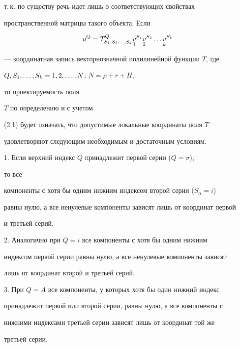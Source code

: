 т.\,к. по существу речь идет лишь о соответствующих свойствах


пространственной матрицы такого объекта. Если


\begin{equation}


u^Q=T^Q_{S_1,S_2,\dotsc,S_k}


\down{1}{v}^{S_1}\down{2}{v}^{S_2}\dotsc\down{k}{v}^{S_k}


\end{equation}


--- координатная запись векторнозначной полилинейной функции $T$, где


$Q,S_1,\dotsc,S_k=\linebreak 1,2,\dotsc,N$; $N=\rho+r+H$,


то проектируемость поля


$T$ по определению и с учетом


(2.1) будет означать, что допустимые локальные координаты поля $T$


удовлетворяют следующим необходимым и достаточным условиям.





1. Если верхний индекс $Q$ принадлежит первой серии ($Q=\sigma$),


то все


компоненты с хотя бы одним нижним индексом второй серии ($S_\alpha=i$)


равны нулю, а все ненулевые компоненты зависят лишь от координат первой


и третьей серий.





2. Аналогично при $Q=i$ все компоненты с хотя бы одним нижним


индексом первой серии равны нулю, а все ненулевые компоненты зависят


лишь от координат второй и третьей серий.





3. При $Q=A$ все компоненты, у которых хотя бы один нижний индекс


принадлежит первой или второй серии, равны нулю, а все компоненты с


нижними индексами третьей серии зависят лишь от координат той же


третьей серии.





